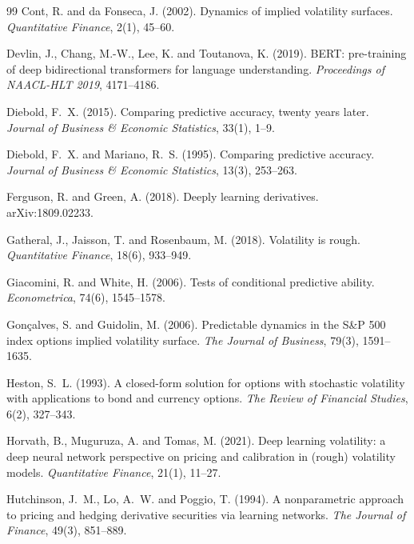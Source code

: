 \documentclass[11pt,a4paper]{article}
\begin{document}
\begin{thebibliography}{99}
Cont, R. and da Fonseca, J. (2002). Dynamics of implied volatility surfaces.
\emph{Quantitative Finance}, 2(1), 45--60.

Devlin, J., Chang, M.-W., Lee, K. and Toutanova, K. (2019). BERT: pre-training
of deep bidirectional transformers for language understanding. \emph{Proceedings
of NAACL-HLT 2019}, 4171--4186.

Diebold, F.~X. (2015). Comparing predictive accuracy, twenty years later.
\emph{Journal of Business \& Economic Statistics}, 33(1), 1--9.

Diebold, F.~X. and Mariano, R.~S. (1995). Comparing predictive accuracy.
\emph{Journal of Business \& Economic Statistics}, 13(3), 253--263.

Ferguson, R. and Green, A. (2018). Deeply learning derivatives.
arXiv:1809.02233.

Gatheral, J., Jaisson, T. and Rosenbaum, M. (2018). Volatility is rough.
\emph{Quantitative Finance}, 18(6), 933--949.

Giacomini, R. and White, H. (2006). Tests of conditional predictive ability.
\emph{Econometrica}, 74(6), 1545--1578.

Gon\c{c}alves, S. and Guidolin, M. (2006). Predictable dynamics in the S\&P 500
index options implied volatility surface. \emph{The Journal of Business}, 79(3),
1591--1635.

Heston, S.~L. (1993). A closed-form solution for options with stochastic
volatility with applications to bond and currency options. \emph{The Review of
Financial Studies}, 6(2), 327--343.

Horvath, B., Muguruza, A. and Tomas, M. (2021). Deep learning volatility: a deep
neural network perspective on pricing and calibration in (rough) volatility
models. \emph{Quantitative Finance}, 21(1), 11--27.

Hutchinson, J.~M., Lo, A.~W. and Poggio, T. (1994). A nonparametric approach to
pricing and hedging derivative securities via learning networks. \emph{The
Journal of Finance}, 49(3), 851--889.


\end{thebibliography}
\end{document}
